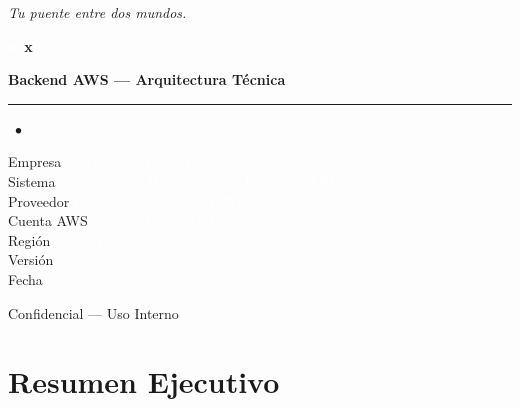 \documentclass[12pt,a4paper]{article}
\begin{document}
\begin{titlepage}
  \pagecolor{nexoBlack}
  \color{white}
  \centering
  \vspace*{3cm}

  {\large\textcolor{nexoSlate}\itshape Tu puente entre dos mundos.\par}
  \vspace{1.2cm}

  {\fontsize{52}{56}\selectfont\bfseries
    \textcolor{white}{ne}\textcolor{nexoCyan}{x}\textcolor{white}{o}\par}
  \vspace{0.4cm}
  {\LARGE\bfseries Backend AWS --- Arquitectura Técnica\par}

  \vspace{1.8cm}
  \textcolor{nexoCyan}{\rule{0.55\textwidth}{1.5pt}}%
  \textcolor{nexoCyan}{\large\ $\bullet$}\par

  \vspace{1.5cm}
  {\large
    \textcolor{nexoSlate}{Empresa}\quad\textcolor{white}{nexo courier (Costa Rica)} \\[0.5em]
    \textcolor{nexoSlate}{Sistema}\quad\textcolor{white}{Autenticación, Base de Datos, Pedidos y API} \\[0.5em]
    \textcolor{nexoSlate}{Proveedor}\quad\textcolor{white}{Amazon Web Services (AWS)} \\[0.5em]
    \textcolor{nexoSlate}{Cuenta AWS}\quad\textcolor{white}{nexo-prod (769953010359)} \\[0.5em]
    \textcolor{nexoSlate}{Región}\quad\textcolor{white}{us-east-1} \\[0.5em]
    \textcolor{nexoSlate}{Versión}\quad\textcolor{white}{3.0} \\[0.5em]
    \textcolor{nexoSlate}{Fecha}\quad\textcolor{white}{Mayo 2026}
  }

  \vfill
  {\small\textcolor{nexoSlate}{Confidencial --- Uso Interno}}
\end{titlepage}

\pagecolor{white}
\color{black}

\tableofcontents
\newpage

\section{Resumen Ejecutivo}
\end{document}
